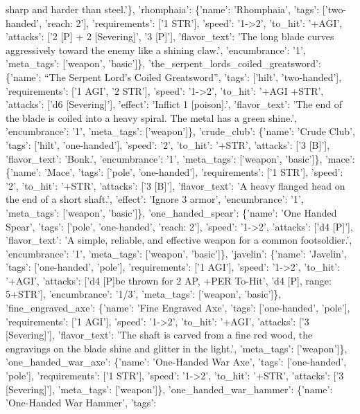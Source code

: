 \documentclass[
  letterpaper,
  DIV=11,
  numbers=noendperiod]{scrartcl}
\begin{document}
{sharp and harder than steel.'\}, 'rhomphaia': \{'name': 'Rhomphaia',
'tags': {[}'two-handed', 'reach: 2'{]}, 'requirements': {[}'1 STR'{]},
'speed': '1-\textgreater2', 'to\_hit': '+AGI', 'attacks': {[}'2 {[}P{]}
+ 2 {[}Severing{]}', '3 {[}P{]}'{]}, 'flavor\_text': 'The long blade
curves aggressively toward the enemy like a shining claw.',
'encumbrance': '1', 'meta\_tags': {[}'weapon', 'basic'{]}\},
'the\_serpent\_lords\_coiled\_greatsword': \{'name': ``The Serpent
Lord's Coiled Greatsword'', 'tags': {[}'hilt', 'two-handed'{]},
'requirements': {[}'1 AGI', '2 STR'{]}, 'speed': '1-\textgreater2',
'to\_hit': '+AGI +STR', 'attacks': {[}'d6 {[}Severing{]}'{]}, 'effect':
'Inflict 1 {[}poison{]}.', 'flavor\_text': 'The end of the blade is
coiled into a heavy spiral. The metal has a green shine.',
'encumbrance': '1', 'meta\_tags': {[}'weapon'{]}\}, 'crude\_club':
\{'name': 'Crude Club', 'tags': {[}'hilt', 'one-handed'{]}, 'speed':
'2', 'to\_hit': '+STR', 'attacks': {[}'3 {[}B{]}'{]}, 'flavor\_text':
'Bonk.', 'encumbrance': '1', 'meta\_tags': {[}'weapon', 'basic'{]}\},
'mace': \{'name': 'Mace', 'tags': {[}'pole', 'one-handed'{]},
'requirements': {[}'1 STR'{]}, 'speed': '2', 'to\_hit': '+STR',
'attacks': {[}'3 {[}B{]}'{]}, 'flavor\_text': 'A heavy flanged head on
the end of a short shaft.', 'effect': 'Ignore 3 armor', 'encumbrance':
'1', 'meta\_tags': {[}'weapon', 'basic'{]}\}, 'one\_handed\_spear':
\{'name': 'One Handed Spear', 'tags': {[}'pole', 'one-handed', 'reach:
2'{]}, 'speed': '1-\textgreater2', 'attacks': {[}'d4 {[}P{]}'{]},
'flavor\_text': 'A simple, reliable, and effective weapon for a common
footsoldier.', 'encumbrance': '1', 'meta\_tags': {[}'weapon',
'basic'{]}\}, 'javelin': \{'name': 'Javelin', 'tags': {[}'one-handed',
'pole'{]}, 'requirements': {[}'1 AGI'{]}, 'speed': '1-\textgreater2',
'to\_hit': '+AGI', 'attacks': {[}'d4 {[}P{]}\nCan be thrown for 2 AP,
+PER To-Hit', 'd4 {[}P{]}, range: 5+STR'{]}, 'encumbrance': '1/3',
'meta\_tags': {[}'weapon', 'basic'{]}\}, 'fine\_engraved\_axe':
\{'name': 'Fine Engraved Axe', 'tags': {[}'one-handed', 'pole'{]},
'requirements': {[}'1 AGI'{]}, 'speed': '1-\textgreater2', 'to\_hit':
'+AGI', 'attacks': {[}'3 {[}Severing{]}'{]}, 'flavor\_text': 'The shaft
is carved from a fine red wood, the engravings on the blade shine and
glitter in the light.', 'meta\_tags': {[}'weapon'{]}\},
'one\_handed\_war\_axe': \{'name': 'One-Handed War Axe', 'tags':
{[}'one-handed', 'pole'{]}, 'requirements': {[}'1 STR'{]}, 'speed':
'1-\textgreater2', 'to\_hit': '+STR', 'attacks': {[}'3
{[}Severing{]}'{]}, 'meta\_tags': {[}'weapon'{]}\},
'one\_handed\_war\_hammer': \{'name': 'One-Handed War Hammer', 'tags':
}
\end{document}
